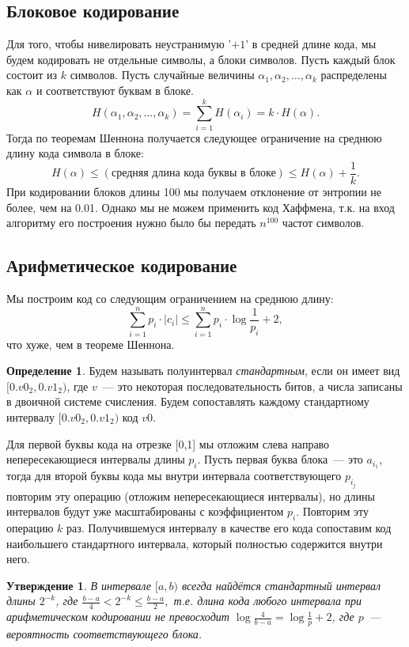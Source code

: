 \documentclass[12pt]{article}
\newcommand{\seqn}[2]{{#1}_1,{#1}_2,\dotsc,{#1}_{#2}}
\theoremstyle{definition}
\newtheorem{definition}{Определение}[section]
\theoremstyle{plain}
\newtheorem{statement}{Утверждение}[section]
\theoremstyle{remark}
\begin{document}
\subsection{Блоковое кодирование}
Для того, чтобы нивелировать неустранимую '$+1$' в средней длине кода, мы будем
кодировать не отдельные символы, а блоки символов.
Пусть каждый блок состоит из $k$ символов. Пусть случайные величины $\seqn{\alpha}{k}$
распределены как $\alpha$ и соответствуют буквам в блоке. 
\[
    H(\seqn{\alpha}{k}) = \sum_{i=1}^k H(\alpha_i) = k\cdot H(\alpha).
\]
Тогда по теоремам Шеннона получается
следующее ограничение на среднюю длину кода символа в блоке:               
\[
    H(\alpha)\le (\text{средняя длина кода буквы в блоке})\le H(\alpha) +
    \frac{1}{k}.
\]
При кодировании блоков длины 100 мы получаем отклонение от энтропии не
более, чем на 0.01. Однако мы не можем применить код Хаффмена, т.к. на
вход алгоритму его построения нужно было бы передать $n^{100}$ частот
символов.

\subsection{Арифметическое кодирование}
Мы построим код со следующим ограничением на среднюю длину:
\[
    \sum_{i=1}^n p_i\cdot|c_i|\le \sum_{i=1}^n p_i\cdot \log\frac1{p_i} + 2, 
\]
что хуже, чем в теореме Шеннона.

\begin{definition}
    Будем называть полуинтервал \emph{стандартным}, если он имеет вид
    $[0.v0_2, 0.v1_2)$, где $v$~--- это некоторая последовательность битов,
    а числа записаны в двоичной системе счисления. Будем сопоставлять каждому
    стандартному интервалу $[0.v0_2, 0.v1_2)$ код $v0$.

    Для первой буквы кода на отрезке [0,1] мы отложим слева направо непересекающиеся интервалы длины
    $p_i$. Пусть первая буква блока~--- это $a_{i_1}$, тогда для второй буквы кода мы внутри интервала
    соответствующего $p_{i_j}$ повторим эту операцию (отложим непересекающиеся интервалы), но длины интервалов 
    будут уже масштабированы с коэффициентом
    $p_i$. Повторим эту операцию $k$ раз. Получившемуся интервалу в качестве его кода 
    сопоставим код наибольшего стандартного интервала, который полностью содержится внутри него.
\end{definition}
\begin{statement}
    В интервале $[a,b)$ всегда найдётся стандартный интервал длины $2^{-k}$, где
    \(
    \frac{b-a}{4}<2^{-k}\le \frac{b-a}{2},
    \)
    т.е. длина кода любого интервала при арифметическом кодировании не
    превосходит $\log \frac{4}{b-a} = \log \frac{1}{p} + 2$, где $p$~--- 
    вероятность соответствующего блока.
\end{statement}
\end{document}
